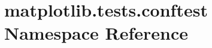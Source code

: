 \hypertarget{namespacematplotlib_1_1tests_1_1conftest}{}\section{matplotlib.\+tests.\+conftest Namespace Reference}
\label{namespacematplotlib_1_1tests_1_1conftest}
